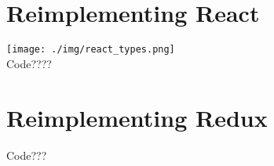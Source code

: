 
\section{Reimplementing React}
\texttt{[image: ./img/react\_types.png]}\\
Code????
\vspace{0.5cm}
\section{Reimplementing Redux}
\vspace{0.5cm}
Code???
\vspace{0.5cm}


